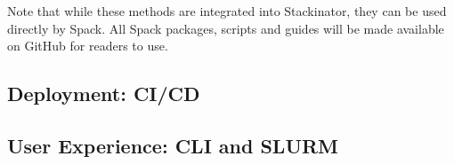 Note that while these methods are integrated into Stackinator, they can be used directly by Spack. All Spack packages, scripts and guides will be made available on GitHub for readers to use.

\subsection{Deployment: CI/CD}
\label{sec:cicd}


\subsection{User Experience: CLI and SLURM}
\label{sec:cli}

